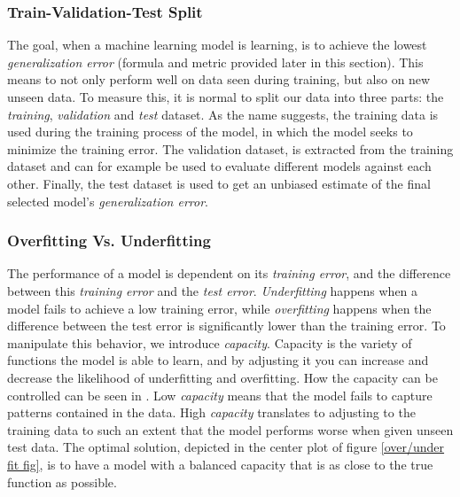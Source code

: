     \subsubsection{Train-Validation-Test Split}
        The goal, when a machine learning model is learning, is to achieve the lowest \textit{generalization error}\cite{Goodfellow-et-al-2016_generalization} (formula and metric provided later in this section). This means to not only perform well on data seen during training, but also on new unseen data. To measure this, it is normal to split our data into three parts\cite{Goodfellow-et-al-2016_train_val_test_split}: the \textit{training}, \textit{validation} and \textit{test} dataset. As the name suggests, the training data is used during the training process of the model, in which the model seeks to minimize the training error. The validation dataset, is extracted from the training dataset and can for example be used to evaluate different models against each other. Finally, the test dataset is used to get an unbiased estimate of the final selected model's \textit{generalization error}.
        
    
    \subsubsection{Overfitting Vs. Underfitting}
        The performance of a model is dependent on its \textit{training error}, and the difference between this \textit{training error} and the \textit{test error}. \textit{Underfitting} happens when a model fails to achieve a low training error, while \textit{overfitting} happens when the difference between the test error is significantly lower than the training error. To manipulate this behavior, we introduce \textit{capacity}. Capacity is the variety of functions the model is able to learn, and by adjusting it you can increase and decrease the likelihood of underfitting and overfitting. How the capacity can be controlled can be seen in \citeauthor{Goodfellow-et-al-2016}\cite{Goodfellow-et-al-2016}. Low \textit{capacity} means that the model fails to capture patterns contained in the data. High \textit{capacity} translates to adjusting to the training data to such an extent that the model performs worse when given unseen test data. The optimal solution, depicted in the center plot of figure \ref{over/under fit fig}, is to have a model with a balanced capacity that is as close to the true function as possible. 
        
        
